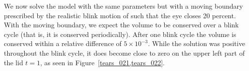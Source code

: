 We now solve the model with the same parameters but with a moving boundary prescribed by the realistic blink motion of \cite{deng2014heat} such that the eye closes 20 percent. With the moving boundary, we expect the volume to be conserved over a blink cycle (that is, it is conserved periodically). After one blink cycle the volume is conserved within a relative difference of $5 \times 10^{-3}$. While the solution was positive throughout the blink cycle, it does become close to zero on the upper left part of the lid $t=1$, as seen in Figure~\ref{tears_021,tears_022}.


%	

